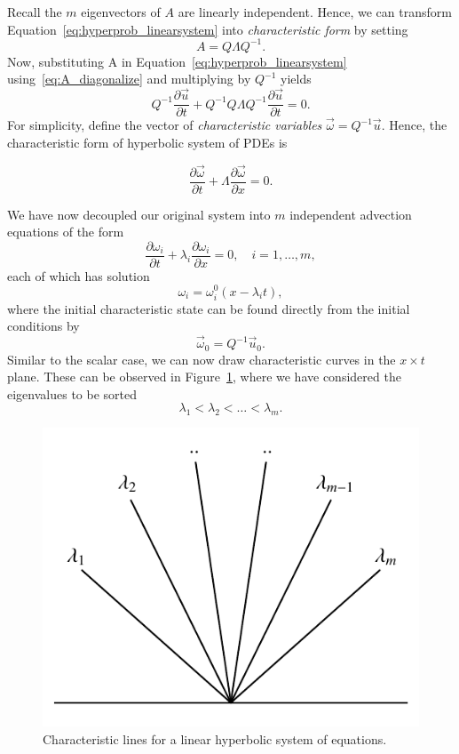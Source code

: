 Recall the $m$ eigenvectors of $A$ are linearly independent. Hence, we can transform Equation~\ref{eq:hyperprob_linearsystem} into \textit{characteristic form} by setting
\begin{equation}
	A = Q \Lambda Q^{-1}.
	\label{eq:A_diagonalize}
\end{equation}
Now, substituting A in Equation~\ref{eq:hyperprob_linearsystem} using~\ref{eq:A_diagonalize} and multiplying by $Q^{-1}$ yields
\begin{equation}
	Q^{-1} \frac{\partial \vec  u}{\partial t} + Q^{-1} Q \Lambda Q^{-1} \frac{\partial \vec u}{\partial t} = 0.
\end{equation}
For simplicity, define the vector of \textit{characteristic variables} $\vec \omega=Q^{-1} \vec{u}$. Hence, the characteristic form of hyperbolic system of PDEs is
\begin{eqBox}
\begin{equation}
	\frac{\partial \vec \omega}{\partial t} + \Lambda \frac{\partial \vec \omega}{\partial x} = 0.
\end{equation}
\end{eqBox}
We have now decoupled our original system into $m$ independent advection equations of the form
\begin{equation}
	\frac{\partial \omega_i}{\partial t} + \lambda_i \frac{\partial \omega_i}{\partial x} = 0,\quad i=1,\ldots,m,
\end{equation}
each of which has solution
\begin{equation}
	\omega_i = \omega_i^0(x-\lambda_i t),
\end{equation}
where the initial characteristic state can be found directly from the initial conditions by
\begin{equation}
	\vec{\omega}_0 = Q^{-1} \vec u_0. 
	\label{eq:initialstatetocharact}
\end{equation}
Similar to the scalar case, we can now draw characteristic curves in the $x\times t$ plane. These can be observed in Figure~\ref{fig:linsys_charact}, where we have considered the eigenvalues to be sorted 
\begin{equation}
	\lambda_1 < \lambda_2 < \ldots < \lambda_m.
\end{equation}
\begin{figure}[htbp]
	\centering
	\includegraphics[width=0.5\linewidth]{Pictures/ch11_lsys_characteristics}
	\caption{Characteristic lines for a linear hyperbolic system of equations.}
	\label{fig:linsys_charact}
\end{figure}
